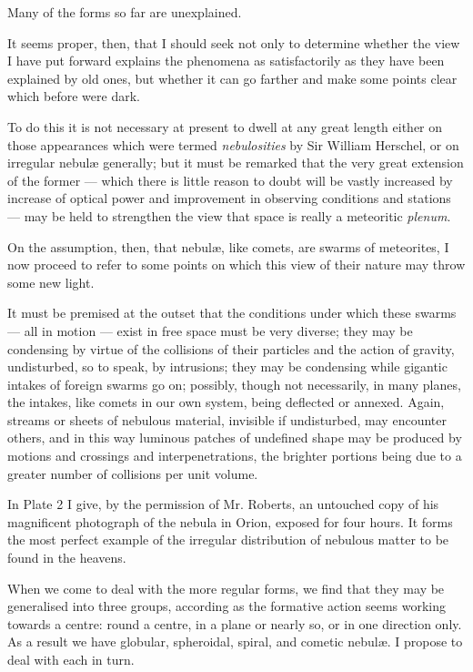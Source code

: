 \documentclass[a4paper, 12pt, oneside, polutonikogreek, english]{article}
\begin{document}
Many of the forms so far are unexplained.

It seems proper, then, that I should seek not only to determine whether the view I have put forward explains the phenomena as satisfactorily as they have been explained by old ones, but whether it can go farther and make some points clear which before were dark.

To do this it is not necessary at present to dwell at any great length either on those appearances which were termed \emph{nebulosities} by Sir William Herschel, or on irregular nebulæ generally; but it must be remarked that the very great extension of the former --- which there is little reason to doubt will be vastly increased by increase of optical power and improvement in observing conditions and stations --- may be held to strengthen the view that space is really a meteoritic \emph{plenum}.

On the assumption, then, that nebulæ, like comets, are swarms of meteorites, I now proceed to refer to some points on which this view of their nature may throw some new light.

It must be premised at the outset that the conditions under which these swarms --- all in motion --- exist in free space must be very diverse; they may be condensing by virtue of the collisions of their particles and the action of gravity, undisturbed, so to speak, by intrusions; they may be condensing while gigantic intakes of foreign swarms go on; possibly, though not necessarily, in many planes, the intakes, like comets in our own system, being deflected or annexed. Again, streams or sheets of nebulous material, invisible if undisturbed, may encounter others, and in this way luminous patches of undefined shape may be produced by motions and crossings and interpenetrations, the brighter portions being due to a greater number of collisions per unit volume.

In Plate 2 I give, by the permission of Mr. Roberts, an untouched copy of his magnificent photograph of the nebula in Orion, exposed for four hours. It forms the most perfect example of the irregular distribution of nebulous matter to be found in the heavens.

When we come to deal with the more regular forms, we find that they may be generalised into three groups, according as the formative action seems working towards a centre: round a centre, in a plane or nearly so, or in one direction only. As a result we have globular, spheroidal, spiral, and cometic nebulæ. I propose to deal with each in turn.
\end{document}
